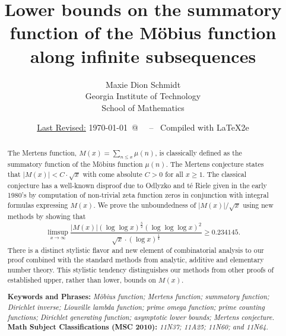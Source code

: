 \documentclass[11pt,reqno,a4letter]{article}
\title{
       \LARGE{
       Lower bounds on the summatory function of the M\"obius function along infinite subsequences 
       } 
}
\author{{\Large Maxie Dion Schmidt} \\ 
        {\normalsize Georgia Institute of Technology} \\[0.025cm] 
        {\normalsize School of Mathematics} 
}
\date{\small\underline{Last Revised:} \today \ @\ \hhmmsstime{} \ -- \ Compiled with \LaTeX2e}
\numberwithin{figure}{section}
\numberwithin{table}{section}
\theoremstyle{plain}
\numberwithin{theorem}{section}
\theoremstyle{definition}
\begin{document}
 

\maketitle

\begin{abstract} 
The Mertens function, $M(x) = \sum_{n \leq x} \mu(n)$, is classically 
defined as the summatory function of the M\"obius function $\mu(n)$. 
The Mertens conjecture states that $|M(x)| < C \cdot \sqrt{x}$ with come absolute $C > 0$ for all 
$x \geq 1$. 
The classical conjecture has a well-known disproof due to 
Odlyzko and t\'{e} Riele given in the early 1980's by computation of 
non-trivial zeta function zeros in conjunction with integral formulas expressing $M(x)$. 
We prove the unboundedness of $|M(x)| / \sqrt{x}$ using new methods by showing that 
$$\limsup_{x \rightarrow \infty} \frac{|M(x)| (\log\log x)^{\frac{5}{2}} (\log\log\log x)^{2}}{ 
  \sqrt{x} \cdot (\log x)^{\frac{1}{4}}} \geq 0.234145.$$ 
There is a distinct stylistic 
flavor and new element of combinatorial analysis to our proof 
combined with the standard methods from analytic, additive and elementary number theory. 
This stylistic tendency distinguishes 
our methods from other proofs of established upper, rather than lower, bounds on $M(x)$. 

\bigskip 
\noindent
\textbf{Keywords and Phrases:} {\it M\"obius function; Mertens function; summatory function; 
                                    Dirichlet inverse; Liouville lambda function; prime omega function; 
                                    prime counting functions; Dirichlet generating function; 
                                    asymptotic lower bounds; Mertens conjecture. } \\ 
\textbf{Math Subject Classifications (MSC 2010):} {\it 11N37; 11A25; 11N60; and 11N64. } 
\end{abstract} 
\end{document}
